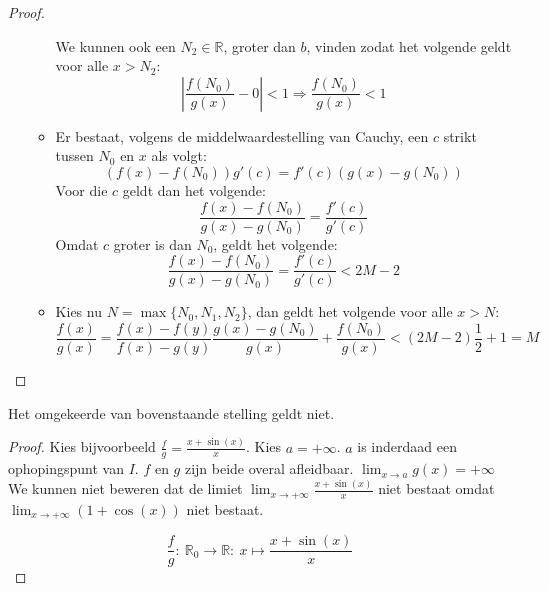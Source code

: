 \documentclass[main.tex]{subfiles}
\begin{document}
\begin{st}
\begin{proof}
\begin{itemize}
\begin{itemize}
        We kunnen ook een $N_{2}\in \mathbb{R}$, groter dan $b$, vinden zodat het volgende geldt voor alle $x>N_{2}$:
        \[ \left| \frac{f(N_{0})}{g(x)} -0 \right| < 1 \Rightarrow \frac{f(N_{0})}{g(x)} < 1 \]
      \item 
        Er bestaat, volgens de middelwaardestelling van Cauchy, een $c$ strikt tussen $N_{0}$ en $x$ als volgt:
        \[ \left( f(x) - f(N_{0}) \right) g'(c) = f'(c) \left( g(x) - g(N_{0}) \right) \]
        Voor die $c$ geldt dan het volgende:
        \[ \frac{f(x)-f(N_{0})}{g(x)-g(N_{0})} = \frac{f'(c)}{g'(c)} \]
        Omdat $c$ groter is dan $N_{0}$, geldt het volgende:
        \[ \frac{f(x)-f(N_{0})}{g(x)-g(N_{0})} = \frac{f'(c)}{g'(c)} < 2M-2 \]
      \item 
        Kies nu $N = \max\{N_{0},N_{1},N_{2}\}$, dan geldt het volgende voor alle $x>N$:
        \[ \frac{f(x)}{g(x)} = \frac{f(x)-f(y)}{f(x)-g(y)}  \frac{g(x)-g(N_{0})}{g(x)} + \frac{f(N_{0})}{g(x)} < (2M-2)\frac{1}{2} + 1 = M \]
      \end{itemize}
    \end{itemize}
  \end{proof}
\end{st}

\begin{tvb}
  Het omgekeerde van bovenstaande stelling geldt niet.
  
  \begin{proof}
    Kies bijvoorbeeld $\frac{f}{g} = \frac{x+\sin(x)}{x}$.
    Kies $a=+\infty$.
    $a$ is inderdaad een ophopingspunt van $I$.
    $f$ en $g$ zijn beide overal afleidbaar.
    $\lim_{x \rightarrow a}g(x) = +\infty$
    We kunnen niet beweren dat de limiet $\lim_{x\rightarrow +\infty}\frac{x+\sin(x)}{x}$ niet bestaat omdat $\lim_{x \rightarrow +\infty}(1+\cos(x))$ niet bestaat.

    \noindent
    \begin{minipage}{.45\textwidth}
    \begin{figure}[H]
      \centering
    \end{figure}
    \end{minipage}
    \begin{minipage}{.45\textwidth}
      \[ \frac{f}{g}:\ \mathbb{R}_{0} \rightarrow \mathbb{R}:\ x \mapsto \frac{x+\sin(x)}{x} \]
    \end{minipage}
  \end{proof}
\end{tvb}
\end{document}

